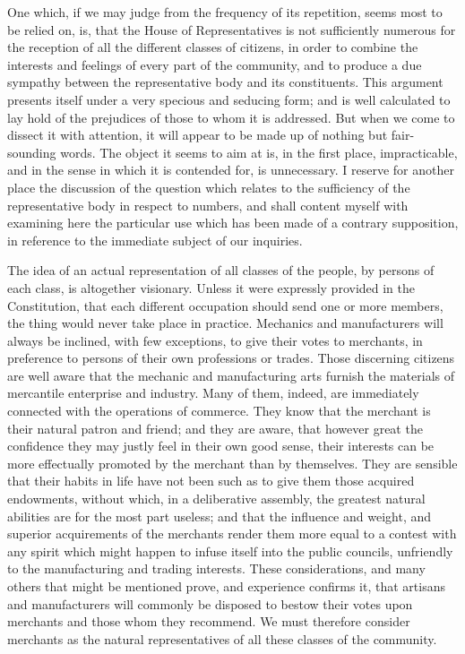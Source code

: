 One which, if we may judge from the frequency of its repetition, seems most to be relied on, is, that the House of Representatives is not sufficiently numerous for the reception of all the different classes of citizens, in order to combine the interests and feelings of every part of the community, and to produce a due sympathy between the representative body and its constituents. 
This argument presents itself under a very specious and seducing form; and is well calculated to lay hold of the prejudices of those to whom it is addressed. 
But when we come to dissect it with attention, it will appear to be made up of nothing but fair-sounding words. 
The object it seems to aim at is, in the first place, impracticable, and in the sense in which it is contended for, is unnecessary. 
I reserve for another place the discussion of the question which relates to the sufficiency of the representative body in respect to numbers, and shall content myself with examining here the particular use which has been made of a contrary supposition, in reference to the immediate subject of our inquiries.

The idea of an actual representation of all classes of the people, by persons of each class, is altogether visionary. 
Unless it were expressly provided in the Constitution, that each different occupation should send one or more members, the thing would never take place in practice. 
Mechanics and manufacturers will always be inclined, with few exceptions, to give their votes to merchants, in preference to persons of their own professions or trades. 
Those discerning citizens are well aware that the mechanic and manufacturing arts furnish the materials of mercantile enterprise and industry. 
Many of them, indeed, are immediately connected with the operations of commerce. 
They know that the merchant is their natural patron and friend; and they are aware, that however great the confidence they may justly feel in their own good sense, their interests can be more effectually promoted by the merchant than by themselves. 
They are sensible that their habits in life have not been such as to give them those acquired endowments, without which, in a deliberative assembly, the greatest natural abilities are for the most part useless; and that the influence and weight, and superior acquirements of the merchants render them more equal to a contest with any spirit which might happen to infuse itself into the public councils, unfriendly to the manufacturing and trading interests. 
These considerations, and many others that might be mentioned prove, and experience confirms it, that artisans and manufacturers will commonly be disposed to bestow their votes upon merchants and those whom they recommend. 
We must therefore consider merchants as the natural representatives of all these classes of the community.


